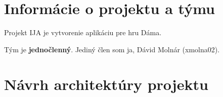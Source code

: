 \documentclass[12pt,a4paper,titlepage,final]{article}
\begin{document}


\def\author{Dávid Molnár}
\def\email{xmolna02@stud.fit.vutbr.cz}
\def\projname{Návrh architektúry projektu IJA}



\pagestyle{plain}
\setcounter{page}{1}

\newpage
\pagestyle{plain}
\setcounter{page}{1}


\section{Informácie o projektu a týmu} \label{tym}
Projekt IJA je vytvorenie aplikáciu pre hru Dáma.

Tým je \textbf{jednočlenný}. Jediný člen som ja, Dávid Molnár (xmolna02).

\section{Návrh architektúry projektu} \label{navrh}

\end{document}
